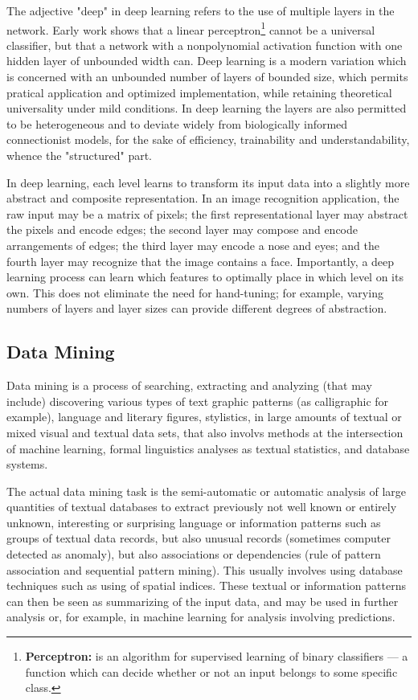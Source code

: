 The adjective "deep" in deep learning refers to the use of multiple layers in the network. Early work shows that a linear perceptron\footnote{\textbf{Perceptron:} is an algorithm for supervised learning of binary classifiers --- a function which can decide whether or not an input belongs to some specific class.} cannot be a universal classifier, but that a network with a nonpolynomial activation function with one hidden layer of unbounded width can. Deep learning is a modern variation which is concerned with an unbounded number of layers of bounded size, which permits pratical application and optimized implementation, while retaining theoretical universality under mild conditions. In deep learning the layers are also permitted to be heterogeneous and to deviate widely from biologically informed connectionist models, for the sake of efficiency, trainability and understandability, whence the "structured" part.

In deep learning, each level learns to transform its input data into a slightly more abstract and composite representation. In an image recognition application, the raw input may be a matrix of pixels; the first representational layer may abstract the pixels and encode edges; the second layer may compose and encode arrangements of edges; the third layer may encode a nose and eyes; and the fourth layer may recognize that the image contains a face. Importantly, a deep learning process can learn which features to optimally place in which level on its own. This does not eliminate the need for hand-tuning; for example, varying numbers of layers and layer sizes can provide different degrees of abstraction.

\subsection{Data Mining}
Data mining is a process of searching, extracting and analyzing (that may include) discovering various types of text graphic patterns (as calligraphic for example), language and literary figures, stylistics, in large amounts of textual or mixed visual and textual data sets, that also involvs methods at the intersection of machine learning, formal linguistics analyses as textual statistics, and database systems.

The actual data mining task is the semi-automatic or automatic analysis of large quantities of textual databases to extract previously not well known or entirely unknown, interesting or surprising language or information patterns such as groups of textual data records, but also unusual records (sometimes computer detected as anomaly), but also associations or dependencies (rule of pattern association and sequential pattern mining). This usually involves using database techniques such as using of spatial indices. These textual or information patterns can then be seen as summarizing of the input data, and may be used in further analysis or, for example, in machine learning for analysis involving predictions.

